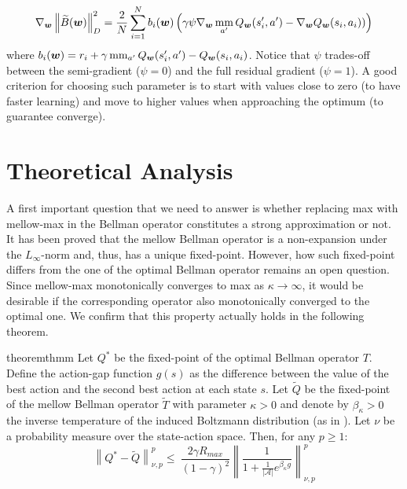 \documentclass{article}
\newcommand{\mm}{\operatornamewithlimits{mm}}
\newcommand{\wt}[1]{\widetilde{#1}}
\newcommand{\norm}[1]{\left\lVert #1 \right\rVert}
\newcommand{\abs}[1]{\left\lvert #1 \right\rvert}
\begin{document}
\begin{equation}
\nabla_{\bm{w}}\norm{\wt{B}(\bm{w})}_{D}^2 = \frac{2}{N}\sum_{i=1}^N b_i(\bm{w})\left( \gamma\psi\nabla_{\bm{w}}\mm_{a'}Q_{\bm{w}}(s_i',a') - \nabla_{\bm{w}}Q_{\bm{w}}(s_i,a_i)) \right)
\end{equation}
where $b_i(\bm{w}) = r_i + \gamma\mm_{a'}Q_{\bm{w}}(s_i',a') - Q_{\bm{w}}(s_i,a_i)$. Notice that $\psi$ trades-off between the semi-gradient ($\psi = 0$) and the full residual gradient ($\psi = 1$). A good criterion for choosing such parameter is to start with values close to zero (to have faster learning) and move to higher values when approaching the optimum (to guarantee converge).

\section{Theoretical Analysis}\label{sec:theory}

A first important question that we need to answer is whether replacing max with mellow-max in the Bellman operator constitutes a strong approximation or not. It has been proved \cite{asadi2017alternative} that the mellow Bellman operator is a non-expansion under the $L_{\infty}$-norm and, thus, has a unique fixed-point.  However, how such fixed-point differs from the one of the optimal Bellman operator remains an open question. Since mellow-max monotonically converges to max as $\kappa \rightarrow \infty$, it would be desirable if the corresponding operator also monotonically converged to the optimal one. We confirm that this property actually holds in the following theorem.

\begin{restatable}{theorem}{thmm} \label{th:mm}
Let $Q^*$ be the fixed-point of the optimal Bellman operator $T$. Define the action-gap function $g(s)$ as the difference between the value of the best action and the second best action at each state $s$. Let $\wt{Q}$ be the fixed-point of the mellow Bellman operator $\wt{T}$ with parameter $\kappa > 0$ and denote by $\beta_{\kappa} > 0$ the inverse temperature of the induced Boltzmann distribution (as in \cite{asadi2017alternative}). Let $\nu$ be a probability measure over the state-action space. Then, for any $p \geq 1$:
\begin{equation}
\norm{Q^*-\wt{Q}}_{\nu,p}^p \leq\ \frac{2\gamma R_{max}}{(1-\gamma)^2}\norm{\frac{1}{1 + \frac{1}{\abs{\mathcal{A}}}e^{\beta_{\kappa} g}}}_{\nu,p}^p
\end{equation}
\end{restatable}
\end{document}
